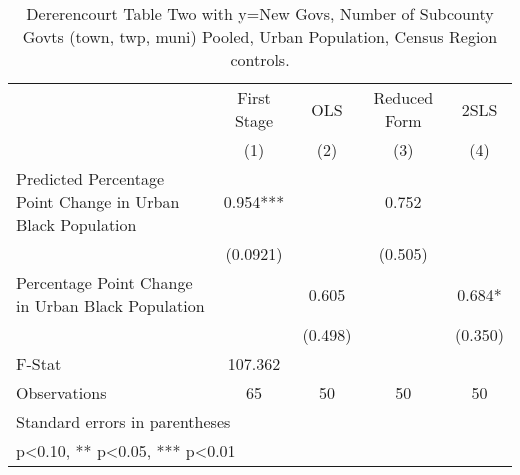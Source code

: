 \begin{table}[htbp]\centering
\def\sym#1{\ifmmode^{#1}\else\(^{#1}\)\fi}
\caption{Dererencourt Table Two with y=New Govs, Number of Subcounty Govts (town, twp, muni)  Pooled, Urban Population, Census Region controls.}
\begin{tabular}{l*{4}{c}}
\toprule
                    & First Stage   &         OLS   &Reduced Form   &        2SLS   \\
                    &\multicolumn{1}{c}{(1)}   &\multicolumn{1}{c}{(2)}   &\multicolumn{1}{c}{(3)}   &\multicolumn{1}{c}{(4)}   \\
\midrule
Predicted Percentage Point Change in Urban Black Population&       0.954***&               &       0.752   &               \\
                    &    (0.0921)   &               &     (0.505)   &               \\
\addlinespace
Percentage Point Change in Urban Black Population&               &       0.605   &               &       0.684*  \\
                    &               &     (0.498)   &               &     (0.350)   \\
\midrule
F-Stat              &     107.362   &               &               &               \\
Observations        &          65   &          50   &          50   &          50   \\
\bottomrule
\multicolumn{5}{l}{\footnotesize Standard errors in parentheses}\\
\multicolumn{5}{l}{\footnotesize * p<0.10, ** p<0.05, *** p<0.01}\\
\end{tabular}
\end{table}
